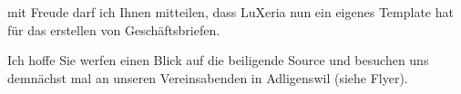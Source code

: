 \documentclass[11pt]{g-brief}
\begin{document}
\begin{g-brief}
mit Freude darf ich Ihnen mitteilen, dass LuXeria
nun ein eigenes Template hat für das erstellen
von Geschäftsbriefen.

Ich hoffe Sie werfen einen Blick auf die beiligende
Source und besuchen uns demnächst mal an unseren 
Vereinsabenden in Adligenswil (siehe Flyer).
\end{g-brief}
\end{document}
